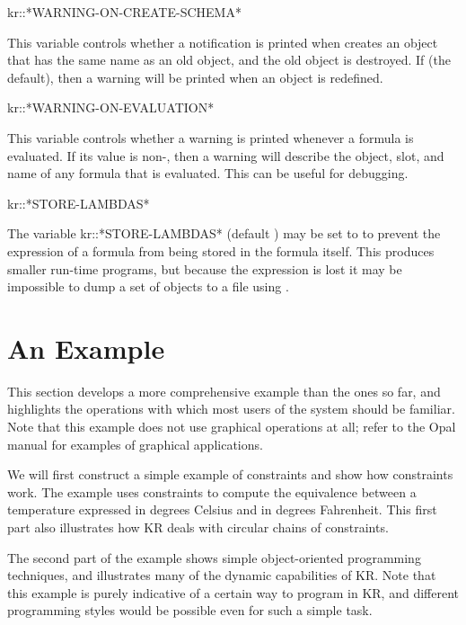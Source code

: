 \value{f-top}
kr::*WARNING-ON-CREATE-SCHEMA*\value{variable}

This variable controls whether a notification is printed when
 creates an object that has the same name as an old object,
and the old object is destroyed.  If \value{t} (the default), then a
warning will be printed when an object is redefined.


\value{f-top}
kr::*WARNING-ON-EVALUATION*\value{variable}

This variable controls whether a warning is printed whenever a formula
is evaluated.  If its value is non-\value{nil}, then a warning will
describe the object, slot, and name of any formula that is evaluated.
This can be useful for debugging.


\value{f-top}
kr::*STORE-LAMBDAS*\value{variable}

The variable kr::*STORE-LAMBDAS* (default \value{t}) may be set
to \value{nil} to prevent the expression of a formula from being stored in the
formula itself.  This produces smaller run-time programs, but because
the expression is lost it may be impossible to dump a set of objects
to a file using .





\chapter{An Example}
\value{top}


This section develops a more comprehensive example than the ones so far,
and highlights the operations with which most users of the system should be
familiar.  Note that this example does not use graphical operations at all;
refer to the Opal manual for examples of graphical applications.

We will first construct a simple example of constraints and show how
constraints work.  The example uses constraints to compute the equivalence
between a temperature expressed in degrees Celsius and in degrees
Fahrenheit.  This first part also illustrates how KR deals with circular
chains of constraints.

The second part of the example shows simple object-oriented programming
techniques, and illustrates many of the dynamic capabilities of KR.  Note
that this example is purely indicative of a certain way to program in KR,
and different programming styles would be possible even for such a simple
task.

